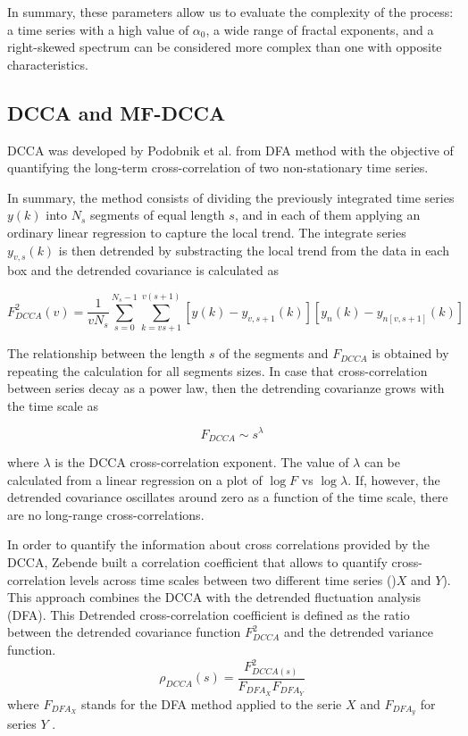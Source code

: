 \documentclass[onecolumn, preprint,aps,amsmath, amssymb, superscriptaddress]{revtex4}
\begin{document}
In summary, these parameters allow us to evaluate the complexity of the process: a time series with a high value of $\alpha_0$, a wide range of fractal exponents, and a right-skewed spectrum can be considered more complex than one with opposite characteristics.

\subsection{DCCA and MF-DCCA}

DCCA was developed by Podobnik et al. \cite{Podobnik} from DFA method with the objective of quantifying the long-term cross-correlation of two non-stationary time series. 

In summary, the method consists of dividing the previously integrated time series $y(k)$ into $N_s$ segments of equal length $s$, and in each of them applying an ordinary linear regression to capture the local trend. 
The integrate series $y_{v,s}(k)$ is then detrended by substracting the local trend from the data in each box and the detrended covariance is calculated as

\begin{equation}
F^2_{DCCA}(v) = \dfrac{1}{vN_s}\sum_{s=0}^{N_s-1}\sum_{k=vs+1}^{v(s+1)}\left[y(k)-y_{v,s+1}(k)\right] \left[y_n(k)-y_{n[v,s+1]}(k)\right]
\end{equation}

The relationship between the length $s$ of the segments and $F_{DCCA}$ is obtained by repeating the calculation for all segments sizes. In case that cross-correlation between series decay as a power law, then the detrending covarianze grows with the time scale as

\begin{equation}
F_{DCCA}\sim s^\lambda
\end{equation}

where $\lambda$ is the DCCA cross-correlation exponent. The value of $\lambda$ can be calculated from a linear regression on a plot of $\log F$ vs $\log \lambda$. If, however, the detrended covariance oscillates around zero as a function of the time scale, there are no long-range cross-correlations.

In order to quantify the information about cross correlations provided by the DCCA, Zebende \cite{Zebende} built a correlation coefficient that allows to quantify cross-correlation levels across time scales between two different time series ()$X$ and $Y$). This approach combines the DCCA with the detrended fluctuation analysis (DFA). This Detrended cross-correlation coefficient is defined as the ratio between the detrended covariance function $F^2_{DCCA}$ and the detrended variance function.
\begin{equation}
    \rho_{DCCA}(s) =\dfrac{F^2_{DCCA(s)}}{F_{DFA_X}F_{DFA_Y}}
\end{equation}
where $F_{DFA_X}$ stands for the DFA method applied to the serie $X$ and $F_{DFA_y}$ for series $Y$ .
\end{document}
